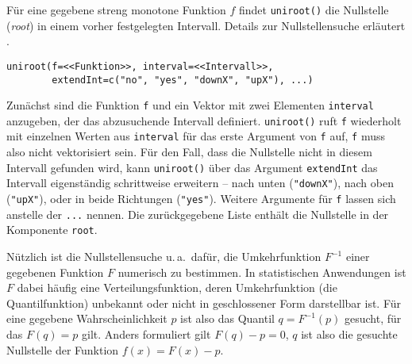 Für eine gegebene streng monotone Funktion $f$ findet \lstinline!uniroot()! die Nullstelle (\emph{root}) in einem vorher festgelegten Intervall. Details zur Nullstellensuche erläutert .
\begin{lstlisting}
uniroot(f=<<Funktion>>, interval=<<Intervall>>,
        extendInt=c("no", "yes", "downX", "upX"), ...)
\end{lstlisting}

Zunächst sind die Funktion \lstinline!f! und ein Vektor mit zwei Elementen \lstinline!interval! anzugeben, der das abzusuchende Intervall definiert. \lstinline!uniroot()! ruft \lstinline!f! wiederholt mit einzelnen Werten aus \lstinline!interval! für das erste Argument von \lstinline!f! auf, \lstinline!f! muss also nicht vektorisiert sein. Für den Fall, dass die Nullstelle nicht in diesem Intervall gefunden wird, kann \lstinline!uniroot()! über das Argument \lstinline!extendInt! das Intervall eigenständig schrittweise erweitern -- nach unten (\lstinline!"downX"!), nach oben (\lstinline!"upX"!), oder in beide Richtungen (\lstinline!"yes"!). Weitere Argumente für \lstinline!f! lassen sich anstelle der \lstinline!...! nennen. Die zurückgegebene Liste enthält die Nullstelle in der Komponente \lstinline!root!.

Nützlich ist die Nullstellensuche u.\,a.\ dafür, die Umkehrfunktion $F^{-1}$ einer gegebenen Funktion $F$ numerisch zu bestimmen. In statistischen Anwendungen ist $F$ dabei häufig eine Verteilungsfunktion, deren Umkehrfunktion (die Quantilfunktion) unbekannt oder nicht in geschlossener Form darstellbar ist. Für eine gegebene Wahrscheinlichkeit $p$ ist also das Quantil $q = F^{-1}(p)$ gesucht, für das $F(q) = p$ gilt. Anders formuliert gilt $F(q) - p = 0$, $q$ ist also die gesuchte Nullstelle der Funktion $f(x) = F(x) - p$.

